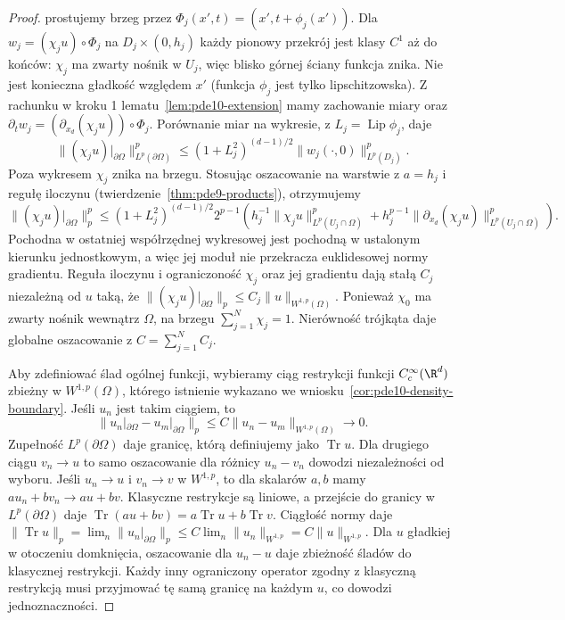 \begin{proof}
prostujemy brzeg przez $\Phi_j(x',t)=(x',t+\phi_j(x'))$.
Dla $w_j=(\chi_j u)\circ\Phi_j$ na $D_j\times(0,h_j)$
każdy pionowy przekrój jest klasy $C^1$ aż do końców:
$\chi_j$ ma zwarty nośnik w $U_j$, więc blisko górnej
ściany funkcja znika. Nie jest konieczna gładkość
względem $x'$ (funkcja $\phi_j$ jest tylko lipschitzowska).
Z rachunku w kroku 1 lematu~\ref{lem:pde10-extension}
mamy zachowanie miary oraz
$\partial_t w_j=(\partial_{x_d}(\chi_j u))\circ\Phi_j$.
Porównanie miar na wykresie, z $L_j=\operatorname{Lip}\phi_j$,
daje
\[
 \|(\chi_j u)|_{\partial\Omega}\|_{L^p(\partial\Omega)}^p
 \le(1+L_j^2)^{(d-1)/2}\|w_j(\cdot,0)\|_{L^p(D_j)}^p.
\]
Poza wykresem $\chi_j$ znika na brzegu. Stosując
oszacowanie na warstwie z $a=h_j$ i regułę iloczynu
(twierdzenie~\ref{thm:pde9-products}), otrzymujemy
\[
 \|(\chi_j u)|_{\partial\Omega}\|_p^p
 \le (1+L_j^2)^{(d-1)/2}2^{p-1}
 \left(h_j^{-1}\|\chi_j u\|_{L^p(U_j\cap\Omega)}^p+
 h_j^{p-1}\|\partial_{x_d}(\chi_j u)\|_{L^p(U_j\cap\Omega)}^p\right).
\]
Pochodna w ostatniej współrzędnej wykresowej jest
pochodną w ustalonym kierunku jednostkowym, a więc jej
moduł nie przekracza euklidesowej normy gradientu.
Reguła iloczynu i ograniczoność $\chi_j$ oraz jej
gradientu dają stałą $C_j$ niezależną od $u$ taką,
że $\|(\chi_j u)|_{\partial\Omega}\|_p
\le C_j\|u\|_{W^{1,p}(\Omega)}$.
Ponieważ $\chi_0$ ma zwarty nośnik wewnątrz $\Omega$,
na brzegu $\sum_{j=1}^N\chi_j=1$. Nierówność trójkąta
daje globalne oszacowanie z $C=\sum_{j=1}^NC_j$.

Aby zdefiniować ślad ogólnej funkcji, wybieramy
ciąg restrykcji funkcji $C_c^\infty(\R^d)$ zbieżny
w $W^{1,p}(\Omega)$, którego istnienie wykazano
we wniosku~\ref{cor:pde10-density-boundary}.
Jeśli $u_n$ jest takim ciągiem, to
\[
 \|u_n|_{\partial\Omega}-u_m|_{\partial\Omega}\|_p
 \le C\|u_n-u_m\|_{W^{1,p}(\Omega)}\longrightarrow0.
\]
Zupełność $L^p(\partial\Omega)$ daje granicę,
którą definiujemy jako $\operatorname{Tr}u$.
Dla drugiego ciągu $v_n\to u$ to samo oszacowanie
dla różnicy $u_n-v_n$ dowodzi niezależności od wyboru.
Jeśli $u_n\to u$ i $v_n\to v$ w $W^{1,p}$,
to dla skalarów $a,b$ mamy $au_n+bv_n\to au+bv$.
Klasyczne restrykcje są liniowe, a przejście do granicy
w $L^p(\partial\Omega)$ daje
$\operatorname{Tr}(au+bv)=a\operatorname{Tr}u+
b\operatorname{Tr}v$.
Ciągłość normy daje
$\|\operatorname{Tr}u\|_p=\lim_n\|u_n|_{\partial\Omega}\|_p
\le C\lim_n\|u_n\|_{W^{1,p}}=C\|u\|_{W^{1,p}}$.
Dla $u$ gładkiej w otoczeniu domknięcia, oszacowanie
dla $u_n-u$ daje zbieżność śladów do klasycznej restrykcji.
Każdy inny ograniczony operator zgodny z klasyczną
restrykcją musi przyjmować tę samą granicę na każdym
$u$, co dowodzi jednoznaczności.
\end{proof}

